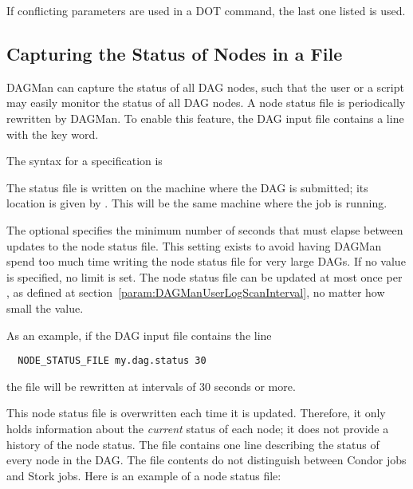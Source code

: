 If conflicting parameters are used in a DOT command, the last one
listed is used.

\subsection{\label{sec:DAG-node-status}Capturing the Status of Nodes in a File}

DAGMan can capture the status of all DAG nodes,
such that the user or a script may easily monitor the status of all DAG nodes.
A node status file is periodically rewritten by DAGMan.
To enable this feature, the DAG input file contains a line with the
 key word.

The syntax for a  specification is

  

The status file is written on the machine where the DAG is submitted;
its location is given by .  
This will be the same machine where the  job is running.

The optional  specifies the minimum number of seconds
that must elapse between updates to the node status file.
This setting exists to avoid having DAGMan spend too much time writing
the node status file for very large DAGs.
If no value is specified, no limit is set.
The node status file can be updated at most once
per ,
as defined at section~\ref{param:DAGManUserLogScanInterval},
no matter how small the  value.

As an example, if the DAG input file contains the line
\begin{verbatim}
  NODE_STATUS_FILE my.dag.status 30
\end{verbatim}
the file  will be rewritten at intervals of 30 seconds
or more.

This node status file is overwritten each time it is updated.
Therefore, it only holds information about the \emph{current} status 
of each node; it does not provide a history of the node status.
The file contains one line describing the status of every node in the DAG.
The file contents do not distinguish between Condor jobs and Stork jobs.
Here is an example of a node status file:

